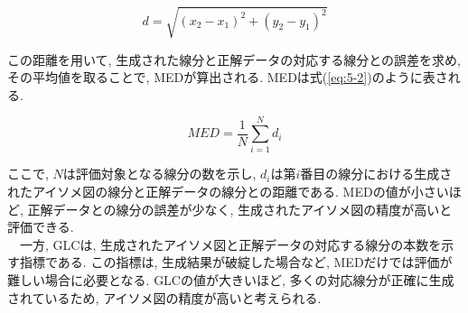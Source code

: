 \begin{equation}
d = \sqrt{(x_2 - x_1)^2 + (y_2 - y_1)^2}
\label{eq:5-1}
\end{equation}

この距離を用いて, 生成された線分と正解データの対応する線分との誤差を求め, その平均値を取ることで, MEDが算出される. 
MEDは式(\ref{eq:5-2})のように表される. 

\begin{equation}
MED = \frac{1}{N} \sum_{i=1}^{N} d_i
\label{eq:5-2}
\end{equation}

ここで, $N$は評価対象となる線分の数を示し, $d_i$は第$i$番目の線分における生成されたアイソメ図の線分と正解データの線分との距離である. 
MEDの値が小さいほど, 正解データとの線分の誤差が少なく, 生成されたアイソメ図の精度が高いと評価できる. \\
　一方, GLCは, 生成されたアイソメ図と正解データの対応する線分の本数を示す指標である. 
この指標は, 生成結果が破綻した場合など, MEDだけでは評価が難しい場合に必要となる. 
GLCの値が大きいほど, 多くの対応線分が正確に生成されているため, アイソメ図の精度が高いと考えられる. 

